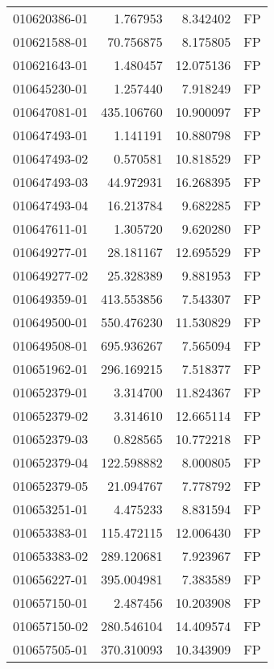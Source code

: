 \begin{tabular}{lrrl}
010620386-01 &    1.767953 &       8.342402 &   FP \\
010621588-01 &   70.756875 &       8.175805 &   FP \\
010621643-01 &    1.480457 &      12.075136 &   FP \\
010645230-01 &    1.257440 &       7.918249 &   FP \\
010647081-01 &  435.106760 &      10.900097 &   FP \\
010647493-01 &    1.141191 &      10.880798 &   FP \\
010647493-02 &    0.570581 &      10.818529 &   FP \\
010647493-03 &   44.972931 &      16.268395 &   FP \\
010647493-04 &   16.213784 &       9.682285 &   FP \\
010647611-01 &    1.305720 &       9.620280 &   FP \\
010649277-01 &   28.181167 &      12.695529 &   FP \\
010649277-02 &   25.328389 &       9.881953 &   FP \\
010649359-01 &  413.553856 &       7.543307 &   FP \\
010649500-01 &  550.476230 &      11.530829 &   FP \\
010649508-01 &  695.936267 &       7.565094 &   FP \\
010651962-01 &  296.169215 &       7.518377 &   FP \\
010652379-01 &    3.314700 &      11.824367 &   FP \\
010652379-02 &    3.314610 &      12.665114 &   FP \\
010652379-03 &    0.828565 &      10.772218 &   FP \\
010652379-04 &  122.598882 &       8.000805 &   FP \\
010652379-05 &   21.094767 &       7.778792 &   FP \\
010653251-01 &    4.475233 &       8.831594 &   FP \\
010653383-01 &  115.472115 &      12.006430 &   FP \\
010653383-02 &  289.120681 &       7.923967 &   FP \\
010656227-01 &  395.004981 &       7.383589 &   FP \\
010657150-01 &    2.487456 &      10.203908 &   FP \\
010657150-02 &  280.546104 &      14.409574 &   FP \\
010657505-01 &  370.310093 &      10.343909 &   FP \\

\end{tabular}

